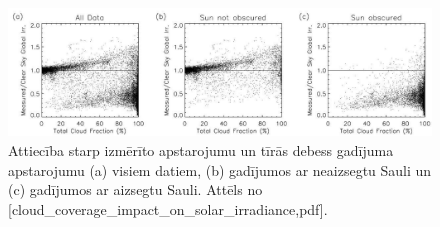 \begin{figure}[h]
	\centering
	\includegraphics[width=\linewidth]{figures/misc/makoni_ietekme.jpg}
	\caption{Attiecība starp izmērīto apstarojumu un tīrās debess gadījuma apstarojumu (a) visiem datiem, (b) gadījumos ar neaizsegtu Sauli un (c) gadījumos ar aizsegtu Sauli. Attēls no [cloud\_coverage\_impact\_on\_solar\_irradiance,pdf].}
	\label{fig:makoni_ietekme}
\end{figure}

